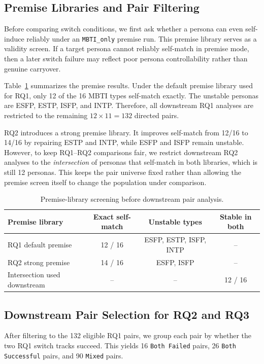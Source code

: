\documentclass[11pt]{article}
\begin{document}
\subsection{Premise Libraries and Pair Filtering}

Before comparing switch conditions, we first ask whether a persona can even self-induce reliably under an \texttt{MBTI\_only} premise run.
This premise library serves as a validity screen.
If a target persona cannot reliably self-match in premise mode, then a later switch failure may reflect poor persona controllability rather than genuine carryover.

Table~\ref{tab:premise} summarizes the premise results.
Under the default premise library used for RQ1, only 12 of the 16 MBTI types self-match exactly.
The unstable personas are ESFP, ESTP, ISFP, and INTP.
Therefore, all downstream RQ1 analyses are restricted to the remaining $12 \times 11 = 132$ directed pairs.

RQ2 introduces a strong premise library.
It improves self-match from 12/16 to 14/16 by repairing ESTP and INTP, while ESFP and ISFP remain unstable.
However, to keep RQ1--RQ2 comparisons fair, we restrict downstream RQ2 analyses to the \emph{intersection} of personas that self-match in both libraries, which is still 12 personas.
This keeps the pair universe fixed rather than allowing the premise screen itself to change the population under comparison.

\begin{table}[t]
\centering
\small
\begin{tabular}{@{}lccc@{}}
\toprule
\textbf{Premise library} & \textbf{Exact self-match} & \textbf{Unstable types} & \textbf{Stable in both} \\
\midrule
RQ1 default premise & 12 / 16 & ESFP, ESTP, ISFP, INTP & -- \\
RQ2 strong premise & 14 / 16 & ESFP, ISFP & -- \\
Intersection used downstream & -- & -- & 12 / 16 \\
\bottomrule
\end{tabular}
\caption{Premise-library screening before downstream pair analysis.}
\label{tab:premise}
\end{table}

\subsection{Downstream Pair Selection for RQ2 and RQ3}

After filtering to the 132 eligible RQ1 pairs, we group each pair by whether the two RQ1 switch tracks succeed.
This yields 16 \texttt{Both Failed} pairs, 26 \texttt{Both Successful} pairs, and 90 \texttt{Mixed} pairs.
\end{document}
